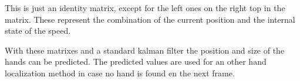 This is just an identity matrix, except for the left ones on the right top in the matrix. These represent the combination of the current position and the internal state of the speed.

With these matrixes and a standard kalman filter the position and size of the hands can be predicted. The predicted values are used for an other hand localization method in case no hand is found en the next frame.




% 









